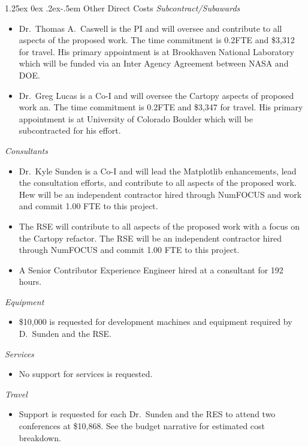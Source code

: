 \documentclass[12pt]{article}
\makeatletter
\numberwithin{page}{section}
\renewcommand{\paragraph}{%
  \@startsection{paragraph}{4}%
  {\z@}{1.25ex \@plus 0ex \@minus .2ex}{-.5em}%
  {\normalfont\normalsize\itshape\bfseries}%
}
\makeatother
\begin{document}
\paragraph{Other Direct Costs}
\textit{Subcontract/Subawards}
\begin{itemize}
  \item Dr.\ Thomas A.\ Caswell is the PI and will oversee and contribute to
    all aspects of the proposed work.  The time commitment is 0.2FTE and \$3,312
    for travel.  His primary appointment is at Brookhaven National Laboratory
    which will be funded via an Inter Agency Agreement between NASA and DOE.
\item Dr.\ Greg Lucas is a Co-I and will oversee the Cartopy aspects of
  proposed work an.  The time commitment is 0.2FTE and \$3,347 for travel.  His
  primary appointment is at University of Colorado Boulder which will be
  subcontracted for his effort.
\end{itemize}
\textit{Consultants}
\begin{itemize}
  \item Dr.\ Kyle Sunden is a Co-I and will lead the Matplotlib enhancements,
    lead the consultation efforts, and contribute to all aspects of the
    proposed work.  Hew will be an independent contractor hired through NumFOCUS and work and commit
    1.00 FTE to this project.
  \item The RSE will contribute to all aspects of the proposed work with a
    focus on the Cartopy refactor.  The RSE will be an independent contractor hired
    through NumFOCUS and commit 1.00 FTE to this project.
  \item A Senior Contributor Experience Engineer hired at a consultant for 192 hours.

\end{itemize}
\textit{Equipment}
\begin{itemize}
\item \$10,000 is requested for development machines and equipment required by D.\ Sunden and the RSE.
\end{itemize}
\textit{Services}
\begin{itemize}
\item No support for services is requested.
\end{itemize}
\textit{Travel}
\begin{itemize}
\item Support is requested for each Dr.\ Sunden and the RES to attend two conferences at
  \$10,868.  See the budget narrative for estimated cost  breakdown.
\end{itemize}
\end{document}
